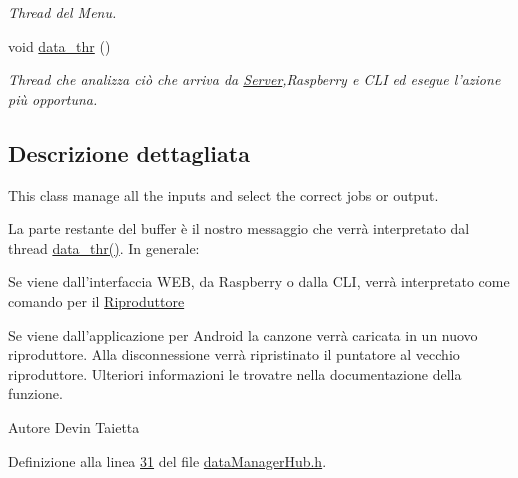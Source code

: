 \begin{DoxyCompactItemize}
\begin{DoxyCompactList}\small\item\em \-Thread del \-Menu. \end{DoxyCompactList}\item 
void \hyperlink{classdataManager_a509a1915ab57d91969f4d7075a138c2e}{data\-\_\-thr} ()
\begin{DoxyCompactList}\small\item\em \-Thread che analizza ciò che arriva da \hyperlink{classServer}{\-Server},\-Raspberry e \-C\-L\-I ed esegue l'azione più opportuna. \end{DoxyCompactList}\end{DoxyCompactItemize}


\subsection{\-Descrizione dettagliata}
\-This class manage all the inputs and select the correct jobs or output. 


\begin{DoxyItemize}
\item \-La parte restante del buffer è il nostro messaggio che verrà interpretato dal thread \hyperlink{classdataManager_a509a1915ab57d91969f4d7075a138c2e}{data\-\_\-thr()}. \-In generale\-:
\begin{DoxyEnumerate}
\item \-Se viene dall'interfaccia \-W\-E\-B, da \-Raspberry o dalla \-C\-L\-I, verrà interpretato come comando per il \hyperlink{classRiproduttore}{\-Riproduttore}
\item \-Se viene dall'applicazione per \-Android la canzone verrà caricata in un nuovo riproduttore. \-Alla disconnessione verrà ripristinato il puntatore al vecchio riproduttore. \-Ulteriori informazioni le trovatre nella documentazione della funzione. \begin{DoxyAuthor}{\-Autore}
\-Devin \-Taietta 
\end{DoxyAuthor}

\end{DoxyEnumerate}
\end{DoxyItemize}

\-Definizione alla linea \hyperlink{dataManagerHub_8h_source_l00031}{31} del file \hyperlink{dataManagerHub_8h_source}{data\-Manager\-Hub.\-h}.



